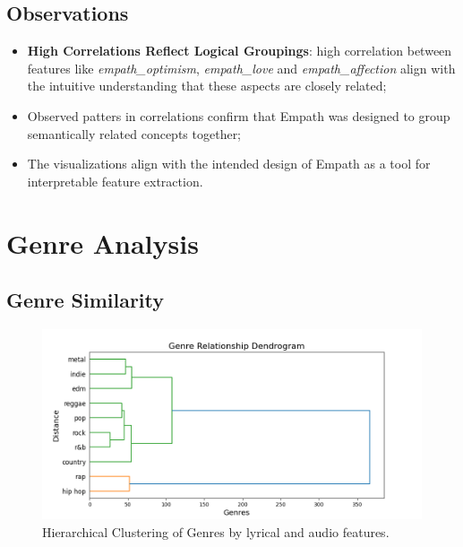 \subsection*{Observations}

\begin{itemize}
  \item \textbf{High Correlations Reflect Logical Groupings}: high correlation
    between features like \textit{empath\_optimism}, \textit{empath\_love} and
    \textit{empath\_affection} align with the intuitive understanding that
    these aspects are closely related;
  \item Observed patters in correlations confirm that Empath was designed to
    group semantically related concepts together;
  \item The visualizations align with the intended design of Empath as a tool
    for interpretable feature extraction.
\end{itemize}



\section{Genre Analysis}

\subsection{Genre Similarity}

\begin{center}
\begin{figure}[H]
  \centering
  \includegraphics[width=5in]{img/genres_dendrogram.png}
  \caption{Hierarchical Clustering of Genres by lyrical and audio features.}
  \label{Figure:dendrogram_spotify_features}
\end{figure}
\end{center}

